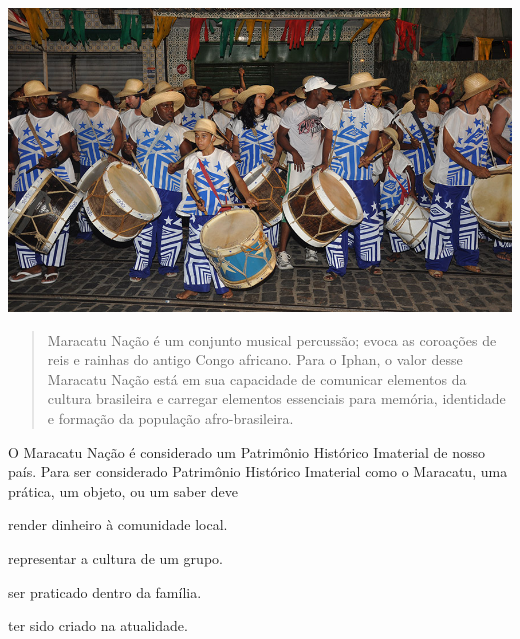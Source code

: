 \begin{minipage}{0.5\textwidth}
\includegraphics[width=.95\textwidth]{./imgs/img66.png}
\end{minipage}
\begin{minipage}{0.5\textwidth}
\begin{quote}
Maracatu Nação é um conjunto musical percussão; evoca as coroações de reis e rainhas do antigo Congo africano.
Para o Iphan, o valor desse Maracatu Nação está em sua
capacidade de comunicar elementos da cultura brasileira e carregar
elementos essenciais para memória, identidade e formação da
população afro-brasileira.

\end{quote}
\end{minipage}\bigskip

\noindent{}O Maracatu Nação é considerado um Patrimônio Histórico Imaterial de
nosso país. Para ser considerado Patrimônio Histórico Imaterial como o
Maracatu, uma prática, um objeto, ou um saber deve

\begin{minipage}{0.5\textwidth}
\begin{escolha}
\item render dinheiro à comunidade local.

\item representar a cultura de um grupo.

\item ser praticado dentro da família.

\item ter sido criado na atualidade.
\end{escolha}
\end{minipage}

